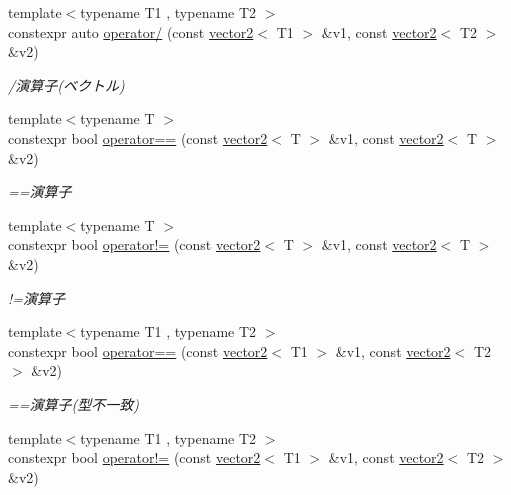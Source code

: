 \begin{DoxyCompactItemize}
{\footnotesize template$<$typename T1 , typename T2 $>$ }\\constexpr auto \mbox{\hyperlink{namespacesaki_af613b8219c84ed98901c66a082938a61}{operator/}} (const \mbox{\hyperlink{classsaki_1_1vector2}{vector2}}$<$ T1 $>$ \&v1, const \mbox{\hyperlink{classsaki_1_1vector2}{vector2}}$<$ T2 $>$ \&v2)
\begin{DoxyCompactList}\small\item\em /演算子(ベクトル) \end{DoxyCompactList}\item 
{\footnotesize template$<$typename T $>$ }\\constexpr bool \mbox{\hyperlink{namespacesaki_a2aafc5056183a1a522b89497ee3439e9}{operator==}} (const \mbox{\hyperlink{classsaki_1_1vector2}{vector2}}$<$ T $>$ \&v1, const \mbox{\hyperlink{classsaki_1_1vector2}{vector2}}$<$ T $>$ \&v2)
\begin{DoxyCompactList}\small\item\em ==演算子 \end{DoxyCompactList}\item 
{\footnotesize template$<$typename T $>$ }\\constexpr bool \mbox{\hyperlink{namespacesaki_ac0c806d3237b6718e95e9b71f838bcc1}{operator!=}} (const \mbox{\hyperlink{classsaki_1_1vector2}{vector2}}$<$ T $>$ \&v1, const \mbox{\hyperlink{classsaki_1_1vector2}{vector2}}$<$ T $>$ \&v2)
\begin{DoxyCompactList}\small\item\em !=演算子 \end{DoxyCompactList}\item 
{\footnotesize template$<$typename T1 , typename T2 $>$ }\\constexpr bool \mbox{\hyperlink{namespacesaki_a07efea0cf7385fc13c00519e8f0f7732}{operator==}} (const \mbox{\hyperlink{classsaki_1_1vector2}{vector2}}$<$ T1 $>$ \&v1, const \mbox{\hyperlink{classsaki_1_1vector2}{vector2}}$<$ T2 $>$ \&v2)
\begin{DoxyCompactList}\small\item\em ==演算子(型不一致) \end{DoxyCompactList}\item 
{\footnotesize template$<$typename T1 , typename T2 $>$ }\\constexpr bool \mbox{\hyperlink{namespacesaki_a0d7159e145464e2deab2de2a76be1c00}{operator!=}} (const \mbox{\hyperlink{classsaki_1_1vector2}{vector2}}$<$ T1 $>$ \&v1, const \mbox{\hyperlink{classsaki_1_1vector2}{vector2}}$<$ T2 $>$ \&v2)

\end{DoxyCompactItemize}
